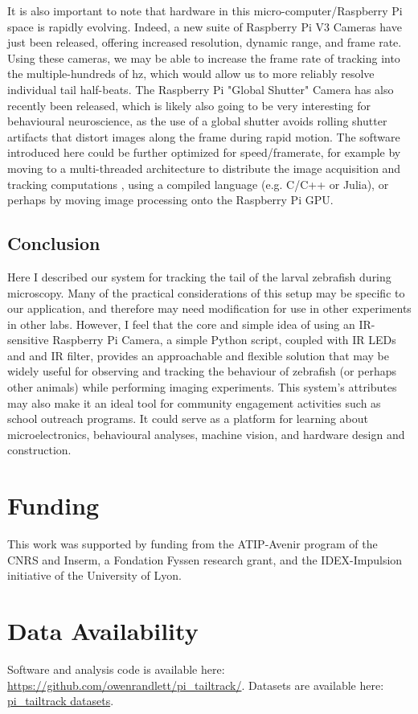 \documentclass[9pt,lineno]{RandlettLab_elife}
\begin{document}
It is also important to note that hardware in this micro-computer/Raspberry Pi space is rapidly evolving. Indeed, a new suite of Raspberry Pi V3 Cameras have just been released, offering increased resolution, dynamic range, and frame rate. Using these cameras, we may be able to increase the frame rate of tracking into the multiple-hundreds of hz, which would allow us to more reliably resolve individual tail half-beats. The Raspberry Pi "Global Shutter" Camera has also recently been released, which is likely also going to be very interesting for behavioural neuroscience, as the use of a global shutter avoids rolling shutter artifacts that distort images along the frame during rapid motion. The software introduced here could be further optimized for speed/framerate, for example by moving to a multi-threaded architecture to distribute the image acquisition and tracking computations \citep{Zhu2023, Randlett2019-fj}, using a compiled language (e.g.  C/C++ or Julia), or perhaps by moving image processing onto the Raspberry Pi GPU. 

\subsection{Conclusion}

Here I described our system for tracking the tail of the larval zebrafish during microscopy. Many of the practical considerations of this setup may be specific to our application, and therefore may need modification for use in other experiments in other labs. However, I feel that the core and simple idea of using an IR-sensitive Raspberry Pi Camera, a simple Python script, coupled with IR LEDs and and IR filter, provides an approachable and flexible solution that may be widely useful for observing and tracking the behaviour of zebrafish (or perhaps other animals) while performing imaging experiments. This system's attributes may also make it an ideal tool for community engagement activities such as school outreach programs. It could serve as a platform for learning about microelectronics, behavioural analyses, machine vision, and hardware design and construction.

\section{Funding}

This work was supported by funding from the ATIP-Avenir program of the CNRS and Inserm, a Fondation Fyssen research grant, and the IDEX-Impulsion initiative of the University of Lyon.

\section{Data Availability}

Software and analysis code is available here:  \href{https://github.com/owenrandlett/pi_tailtrack/}{https://github.com/owenrandlett/pi\_tailtrack/}. Datasets are available here: \href{https://www.dropbox.com/sh/dbjq2dud1ws1o2v/AACLamthISys8sUD1a5oRcR1a?dl=0}{pi\_tailtrack datasets}.


\end{document}
